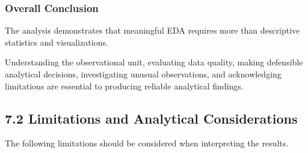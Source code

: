 \documentclass[11pt]{article}
\begin{document}
\subsubsection{Overall Conclusion}\label{overall-conclusion}

The analysis demonstrates that meaningful EDA requires more than
descriptive statistics and visualizations.

Understanding the observational unit, evaluating data quality, making
defensible analytical decisions, investigating unusual observations, and
acknowledging limitations are essential to producing reliable analytical
findings.

    \subsection{7.2 Limitations and Analytical
Considerations}\label{limitations-and-analytical-considerations}

The following limitations should be considered when interpreting the
results.
\end{document}

